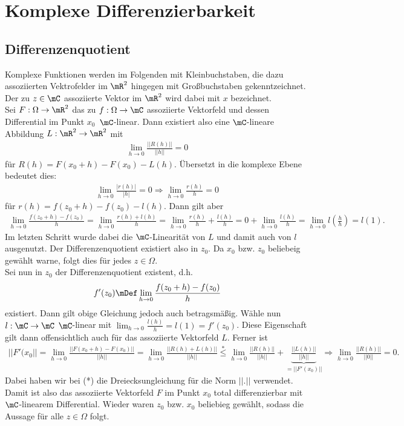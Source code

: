 \section{Komplexe Differenzierbarkeit}
\subsection{Differenzenquotient}
Komplexe Funktionen werden im Folgenden mit Kleinbuchstaben, die dazu assoziierten Vektrofelder im $\mR^{2}$ hingegen mit Großbuchstaben gekenntzeichnet. Der zu $z\in\mC$ assoziierte Vektor im $\mR^{2}$ wird dabei mit $x$ bezeichnet.\\
Sei $F:\Omega\rightarrow \mR^{2}$ das zu $f:\Omega\rightarrow\mC$ assoziierte Vektorfeld und dessen Differential im Punkt $x_{0}$\ $\mC$-linear. Dann existiert also eine $\mC$-lineare Abbildung $L:\mR^{2}\rightarrow\mR^{2}$ mit
\begin{align*}
    \lim_{h\to0}\frac{||R(h)||}{||h||}=0
\end{align*}
für $R(h)=F(x_{0}+h)-F(x_{0})-L(h)$. Übersetzt in die komplexe Ebene bedeutet dies:
\begin{align*}
    \lim_{h\to0}\frac{|r(h)|}{|h|}=0 \Rightarrow \lim_{h\to0}\frac{r(h)}{h}=0
\end{align*}
für $r(h)=f(z_{0}+h)-f(z_{0})-l(h)$. Dann gilt aber
\begin{align*}
    \lim_{h\to0}\frac{f(z_{0}+h)-f(z_{0})}{h}= \lim_{h\to0}\frac{r(h)+l(h)}{h}=\lim_{h\to0}\frac{r(h)}{h}+\frac{l(h)}{h}=0+\lim_{h\to0}\frac{l(h)}{h}=\lim_{h\to0}l\left(\frac{h}{h}\right)=l(1).
\end{align*}
Im letzten Schritt wurde dabei die $\mC$-Linearität von $L$ und damit auch von $l$ ausgenutzt. Der Differenzenquotient existiert also in $z_{0}$. Da $x_{0}$ bzw. $z_{0}$ beliebeig gewählt warne, folgt dies für jedes $z\in\Omega$.\\[8pt]
Sei nun in $z_{0}$ der Differenzenquotient existent, d.h.
\begin{align*}
    f'(z_{0})\mDef\lim_{h\to0}\frac{f(z_{0}+h)-f(z_{0})}{h}
\end{align*}
existiert. Dann gilt obige Gleichung jedoch auch betragsmäßig. Wähle nun $l:\mC\rightarrow\mC$ $\mC$-linear mit $\lim_{h\to0}\frac{l(h)}{h}=l(1)=f'(z_{0})$. Diese Eigenschaft gilt dann offensichtlich auch für das assoziierte Vektorfeld $L$. Ferner ist
\begin{align*}
    ||F'(x_{0}||=\lim_{h\to0}\frac{||F(x_{0}+h)-F(x_{0})||}{||h||}=\lim_{h\to0}\frac{||R(h)+L(h)||}{||h||}\overset{*}{\leq}\lim_{h\to0}\frac{||R(h)||}{||h||}+\underbrace{\frac{||L(h)||}{||h||}}_{=||F'(x_{0})||} \Rightarrow \lim_{h\to0}\frac{||R(h)||}{||0||}=0.
\end{align*}
Dabei haben wir bei (*) die Dreiecksungleichung für die Norm $||.||$ verwendet. Damit ist also das assoziierte Vektorfeld $F$ im Punkt $x_{0}$ total differenzierbar mit $\mC$-linearem Differential. Wieder waren $z_{0}$ bzw. $x_{0}$ beliebieg gewählt, sodass die Aussage für alle $z\in\Omega$ folgt.

